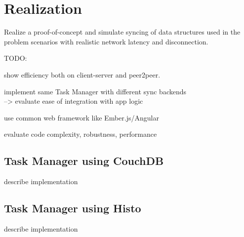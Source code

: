 
\chapter{Realization}
\label{sec:realization}

Realize a proof-of-concept and simulate syncing of data structures
used in the problem scenarios with realistic network latency and
disconnection.

TODO:

show efficiency both on client-server and peer2peer.

implement same Task Manager with different sync backends\\
--> evaluate ease of integration with app logic

use common web framework like Ember.js/Angular

evaluate code complexity, robustness, performance

\section{Task Manager using CouchDB}

describe implementation

\section{Task Manager using Histo}

describe implementation
